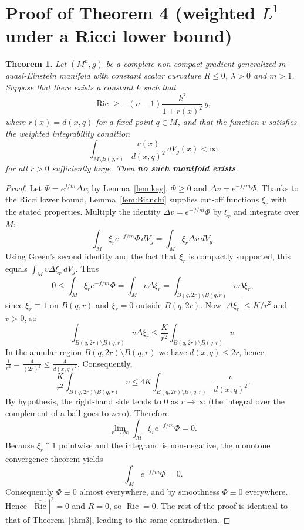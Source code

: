 \documentclass[10pt,a4paper]{amsart}
\newcommand{\Ric}{\operatorname{Ric}}
\newtheorem{theorem}{Theorem}[section]
\begin{document}
\section{Proof of Theorem 4 (weighted $L^1$ under a Ricci lower bound)}
\label{sec:thm4}


\begin{theorem}\label{thm4}
Let $(M^n,g)$ be a complete non-compact gradient generalized $m$-quasi-Einstein manifold with constant scalar curvature $R\le 0$, $\lambda>0$ and $m>1$.
Suppose that there exists a constant $k$ such that
\[
\Ric \ge -(n-1)\frac{k^2}{1+r(x)^2}\,g,
\]
where $r(x)=d(x,q)$ for a fixed point $q\in M$, and that the function $v$ satisfies the weighted integrability condition
\[
\int_{M\setminus B(q,r)} \frac{v(x)}{d(x,q)^2}\,dV_g(x) < \infty
\]
for all $r>0$ sufficiently large.
Then \textbf{no such manifold exists}.
\end{theorem}

\begin{proof}
Let $\Phi = e^{f/m}\Delta v$; by Lemma~\ref{lem:key}, $\Phi\ge 0$ and $\Delta v = e^{-f/m}\Phi$.
Thanks to the Ricci lower bound, Lemma~\ref{lem:Bianchi} supplies cut-off functions $\xi_r$ with the stated properties.
Multiply the identity $\Delta v = e^{-f/m}\Phi$ by $\xi_r$ and integrate over $M$:
\[
\int_M \xi_r e^{-f/m}\Phi \,dV_g = \int_M \xi_r \Delta v \,dV_g.
\]
Using Green's second identity and the fact that $\xi_r$ is compactly supported, this equals $\int_M v \Delta \xi_r \,dV_g$.
Thus
\[
0 \le \int_M \xi_r e^{-f/m}\Phi = \int_M v \Delta \xi_r
= \int_{B(q,2r)\setminus B(q,r)} v \Delta \xi_r,
\]
since $\xi_r\equiv 1$ on $B(q,r)$ and $\xi_r=0$ outside $B(q,2r)$.
Now $|\Delta \xi_r|\le K/r^2$ and $v>0$, so
\[
\int_{B(q,2r)\setminus B(q,r)} v \Delta \xi_r \le \frac{K}{r^2}\int_{B(q,2r)\setminus B(q,r)} v.
\]
In the annular region $B(q,2r)\setminus B(q,r)$ we have $d(x,q)\le 2r$, hence
$\frac{1}{r^2} = \frac{4}{(2r)^2} \le \frac{4}{d(x,q)^2}$.
Consequently,
\[
\frac{K}{r^2}\int_{B(q,2r)\setminus B(q,r)} v
\le 4K \int_{B(q,2r)\setminus B(q,r)} \frac{v}{d(x,q)^2}.
\]
By hypothesis, the right-hand side tends to $0$ as $r\to\infty$ (the integral over the complement of a ball goes to zero).
Therefore
\[
\lim_{r\to\infty}\int_M \xi_r e^{-f/m}\Phi = 0.
\]
Because $\xi_r\uparrow 1$ pointwise and the integrand is non-negative, the monotone convergence theorem yields
\[
\int_M e^{-f/m}\Phi = 0.
\]
Consequently $\Phi\equiv 0$ almost everywhere, and by smoothness $\Phi\equiv 0$ everywhere.
Hence $|\hat{\Ric}|^2=0$ and $R=0$, so $\Ric=0$.
The rest of the proof is identical to that of Theorem~\ref{thm3}, leading to the same contradiction.
\end{proof}
\end{document}
